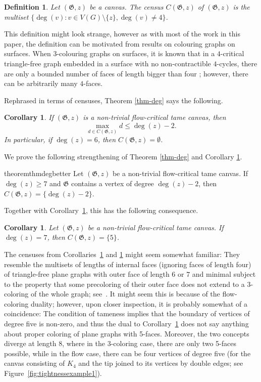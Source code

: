 \documentclass{article}
\newcommand\g{\mathfrak{G}}
\newtheorem{corollary}[theorem]{Corollary}
\newtheorem{definition}[theorem]{Definition}
\begin{document}
\begin{definition}
Let $(\g,z)$ be a canvas. The \emph{census} $C(\g,z)$ of $(\g,z)$ is the multiset $\{\deg(v) : v \in V(G) \setminus \{z\}, \deg(v) \neq 4\}$. 
\end{definition}

This definition might look strange, however as with most of the work in this paper, the definition can be motivated from results on colouring graphs on surfaces. When $3$-colouring graphs on surfaces, it is known that in a $4$-critical triangle-free graph embedded in a surface with no non-contractible $4$-cycles, there are only a bounded number of faces of length bigger than four \cite{trfree2,trfree3}; however, there can be arbitrarily many $4$-faces. 

Rephrased in terms of censuses, Theorem \ref{thm-deg} says the following.

\begin{corollary}\label{cor-censmax}
If $(\g,z)$ is a non-trivial flow-critical tame canvas, then $$\max_{d \in C(\g,z)} d \le \deg(z)-2.$$  In particular, if $\deg(z)=6$, then $C(\g,z)=\emptyset$.
\end{corollary}

We prove the following strengthening of Theorem \ref{thm-deg} and Corollary \ref{cor-censmax}.

\begin{restatable}{theorem}{thmdegbetter}\label{thm-degbetter}
Let $(\g,z)$ be a non-trivial flow-critical tame canvas.
If $\deg(z)\ge 7$ and $\g$ contains a vertex of degree $\deg(z)-2$, then $C(\g,z)=\{\deg(z)-2\}$.
\end{restatable}

Together with Corollary~\ref{cor-censmax}, this has the following consequence.
\begin{corollary}\label{cor-degbetter}
Let $(\g,z)$ be a non-trivial flow-critical tame canvas.
If $\deg(z)=7$, then $C(\g,z)=\{5\}$.
\end{corollary}

The censuses from Corollaries~\ref{cor-censmax} and \ref{cor-degbetter} might seem somewhat familiar:
They resemble the multisets of lengths of internal faces (ignoring faces of length four)
of triangle-free plane graphs with outer face of length $6$ or $7$ and minimal subject to the
property that some precoloring of their outer face does not extend to a 3-coloring of the whole
graph; see~\cite{col8cyc}.  It might seem this is because of the flow-coloring duality; however,
upon closer inspection, it is probably somewhat of a coincidence:  The condition of tameness
implies that the boundary of vertices of degree five is non-zero, and thus the dual to Corollary~\ref{cor-degbetter}
does not say anything about proper coloring of plane graphs with 5-faces.  Moreover, the
two concepts diverge at length $8$, where in the $3$-coloring case, there are only two 5-faces possible,
while in the flow case, there can be four vertices of degree five (for the canvas consisting of $K_4$
and the tip joined to its vertices by double edges; see Figure~\ref{fig:tightnessexample1}).
\end{document}

